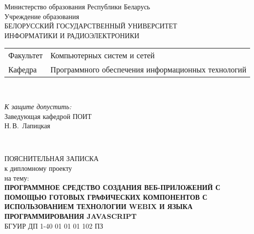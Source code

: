 \begin{titlepage}
  \begin{center}
    Министерство образования Республики Беларусь\\[1em]
    Учреждение образования\\
    БЕЛОРУССКИЙ ГОСУДАРСТВЕННЫЙ УНИВЕРСИТЕТ \\
    ИНФОРМАТИКИ И РАДИОЭЛЕКТРОНИКИ\\[1em]

    \begin{minipage}{\textwidth}
      \begin{flushleft}
        \begin{tabular}{ l l }
          Факультет & Компьютерных систем и сетей\\
          Кафедра   & Программного обеспечения информационных технологий
        \end{tabular}
      \end{flushleft}
    \end{minipage}\\[1em]

    \begin{flushright}
      \begin{minipage}{0.4\textwidth}
        \textit{К защите допустить:}\\[0.8em]
        Заведующая кафедрой ПОИТ\\[0.45em]
        \underline{\hspace*{2.8cm}} Н.\,В.~Лапицкая
      \end{minipage}\\[2.2em]
    \end{flushright}

    {ПОЯСНИТЕЛЬНАЯ ЗАПИСКА}\\
    {к дипломному проекту}\\
    {на тему:}\\[1em]
    \textbf{\large \MakeUppercase{Программное средство создания веб-приложений с помощью 
    готовых графических компонентов с использованием технологии Webix и языка программирования JavaScript
    }}\\[1em]


    {БГУИР ДП 1-40 01 01 01 102 ПЗ}\\[2em]
    

\end{center}
\end{titlepage}

